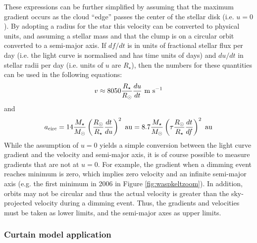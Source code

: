 \documentclass[]{rsos}
\begin{document}
These expressions can be further simplified by assuming that the maximum gradient occurs
as the cloud ``edge'' passes the center of the stellar disk (i.e. $u=0$). By adopting a
radius for the star this velocity can be converted to physical units, and assuming a
stellar mass and that the clump is on a circular orbit converted to a semi-major axis. If
$df/dt$ is in units of fractional stellar flux per day (i.e. the light curve is
normalised and has time units of days) and $du/dt$ in stellar radii per day (i.e. units
of $u$ are $R_\star$), then the numbers for these quantities can be used in the following
equations:
\begin{equation}\label{eq:vcl}
  v \approx  8050 \frac{R_\star}{R_\odot} \frac{du}{dt} ~ {\rm m~s}^{-1}
\end{equation}
and
\begin{equation}\label{eq:acl}
  a_{\rm circ} %
  = 14 \frac{M_\star}{M_\odot} \left( \frac{R_\odot}{R_\star} \frac{dt}{du} \right)^2 ~
  {\rm au}
  = 8.7 \frac{M_\star}{M_\odot} \left( \tau \frac{R_\odot}{R_\star} \frac{dt}{df} \right)^2 ~
  {\rm au}
\end{equation}
While the assumption of $u=0$ yields a simple conversion between the light curve gradient
and the velocity and semi-major axis, it is of course possible to measure gradients that
are not at $u=0$. For example, the gradient when a dimming event reaches minimum is zero,
which implies zero velocity and an infinite semi-major axis (e.g. the first minimum in
2006 in Figure \ref{fig:waspkeltzoom}). In addition, orbits may not be circular and thus
the actual velocity is greater than the sky-projected velocity during a dimming
event. Thus, the gradients and velocities must be taken as lower limits, and the
semi-major axes as upper limits.

\subsubsection{Curtain model application}\label{sss:gradapp}
\end{document}
